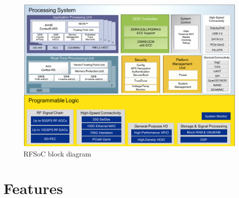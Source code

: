 \begin{figure}[tbh]
	\centering
	\includegraphics[width = \textwidth]{chap/04-work/img/rfsoc_blockdiagram}
	\caption{RFSoC block diagram}
	\label{fig:rfsoc}
\end{figure}
\section{Features}